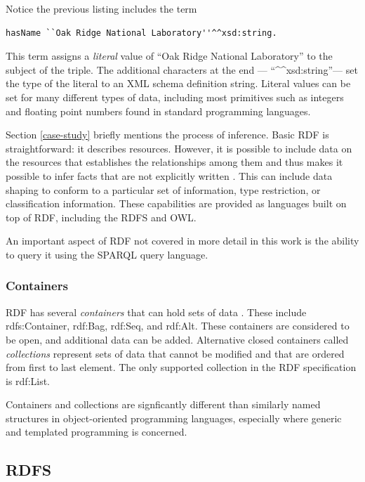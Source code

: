 Notice the previous listing includes the term
\begin{lstlisting}[language=TURTL]
    hasName ``Oak Ridge National Laboratory''^^xsd:string.
\end{lstlisting}
This term assigns a \textit{literal} value of ``Oak Ridge National Laboratory''
to the subject of the triple. The additional characters at the end ---
``\textasciicircum\textasciicircum xsd:string''--- set the type of the literal
to an XML schema definition string. Literal values can be set for many different types of data, including
most primitives such as integers and floating point numbers found in standard
programming languages.

Section \ref{case-study} briefly mentions the process of inference. Basic RDF
is straightforward: it describes resources. However, it is possible to include data
on the resources that establishes the relationships among them and thus makes
it possible to infer facts that are not explicitly written
\cite{allemang_semantic_2008}. This can include data shaping to conform to a
particular set of information, type restriction, or classification information.
These capabilities are provided as languages built on top of RDF, including the
RDFS and OWL.

An important aspect of RDF not covered in more detail in this work is the
ability to query it using the SPARQL query language. 


\subsubsection{Containers}

RDF has several \textit{containers} that can hold sets of data
\cite{noauthor_rdf_nodate-3}. These include rdfs:Container, rdf:Bag, rdf:Seq,
and rdf:Alt. These containers are considered to be open, and additional data can
be added. Alternative closed containers called \textit{collections} represent
sets of data that cannot be modified and that are ordered from first to last
element. The only supported collection in the RDF specification is rdf:List.

Containers and collections are signficantly different than similarly named
structures in object-oriented programming languages, especially where generic
and templated programming is concerned.

\subsection{RDFS}

